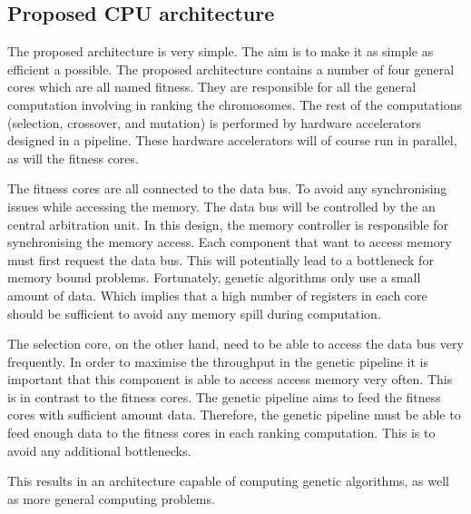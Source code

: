 \subsection {Proposed CPU architecture}

The proposed architecture is very simple. The aim is to make it as simple as efficient a possible. The proposed architecture contains a number of four general cores which are all named fitness. They are responsible for all the general computation involving in ranking the chromosomes. The rest of the computations (selection, crossover, and mutation) is performed by hardware accelerators designed in a pipeline. These hardware accelerators will of course run in parallel, as will the fitness cores.

The fitness cores are all connected to the data bus. To avoid any synchronising issues while accessing the memory. The data bus will be controlled by the an central arbitration unit. In this design, the memory controller is responsible for synchronising the memory access. Each component that want to access memory must first request the data bus. This will potentially lead to a bottleneck for memory bound problems. Fortunately, genetic algorithms only use a small amount of data. Which implies that a high number of registers in each core should be sufficient to avoid any memory spill during computation. 

The selection core, on the other hand, need to be able to access the data bus very frequently. In order to maximise the throughput in the genetic pipeline it is important that this component is able to access access memory very often. This is in contrast to the fitness cores. The genetic pipeline aims to feed the fitness cores with sufficient amount data. Therefore, the genetic pipeline must be able to feed enough data to the fitness cores in each ranking computation. This is to avoid any additional bottlenecks. 

This results in an architecture capable of computing genetic algorithms, as well as more general computing problems.  

